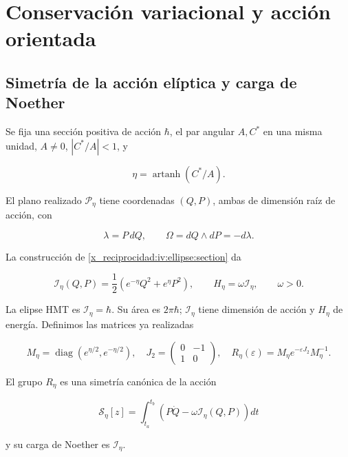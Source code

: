 \chapter{Conservación variacional y acción orientada}
\label{x_reciprocidad:nuclear:7}
\section{Simetría de la acción elíptica y carga de Noether}

Se fija una sección positiva de acción \(\hbar\), el par angular \(A,C^*\) en una misma unidad, \(A\ne0\), \(|C^*/A|<1\), y

\[
\eta=\operatorname{artanh}(C^*/A).
\]

El plano realizado \(\mathcal P_\eta\) tiene coordenadas \((Q,P)\), ambas de dimensión raíz de acción, con

\[
\lambda=P\,dQ,\qquad \Omega=dQ\wedge dP=-d\lambda.
\]

La construcción de \cref{x_reciprocidad:iv:ellipse:section} da

\begin{equation}
\mathcal I_\eta(Q,P)=\frac12(e^{-\eta}Q^2+e^\eta P^2),
\qquad H_\eta=\omega\mathcal I_\eta,\qquad \omega>0.
\label{x_reciprocidad:nuc07:eq:1}
\end{equation}

La elipse HMT es \(\mathcal I_\eta=\hbar\). Su área es \(2\pi\hbar\); \(\mathcal I_\eta\) tiene dimensión de acción y \(H_\eta\) de energía. Definimos las matrices ya realizadas

\begin{equation}
M_\eta=\operatorname{diag}(e^{\eta/2},e^{-\eta/2}),\quad
J_2=\begin{pmatrix}0&-1\\1&0\end{pmatrix},\quad
R_\eta(\varepsilon)=M_\eta e^{-\varepsilon J_2}M_\eta^{-1}.
\label{x_reciprocidad:nuc07:eq:2}
\end{equation}

\begin{proposition}
El grupo \(R_\eta\) es una simetría canónica de la acción

\begin{equation}
\mathscr S_\eta[z]=\int_{t_a}^{t_b}
\left(P\dot Q-\omega\mathcal I_\eta(Q,P)\right)dt
\label{x_reciprocidad:nuc07:eq:3}
\end{equation}

y su carga de Noether es \(\mathcal I_\eta\).
\end{proposition}

